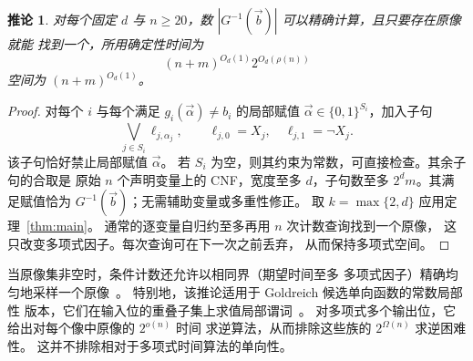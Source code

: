 \documentclass[11pt,reqno]{amsart}
\numberwithin{equation}{section}
\newtheorem{corollary}[theorem]{推论}
\theoremstyle{definition}\newtheorem{definition}[theorem]{定义}
\theoremstyle{remark}\newtheorem{remark}[theorem]{注}
\renewcommand{\ge}{\geqslant}
\begin{document}
\begin{corollary}\label{cor:consequence-local-inversion}
对每个固定 $d$ 与 $n\ge20$，数
$|G^{-1}(\vec{b})|$ 可以精确计算，且只要存在原像就能
找到一个，所用确定性时间为
\[
 (n+m)^{O_d(1)}2^{O_d(\rho(n))}
\]
空间为 $(n+m)^{O_d(1)}$。
\end{corollary}
\begin{proof}
对每个 $i$ 与每个满足 $g_i(\vec{\alpha})\ne b_i$ 的局部赋值
$\vec{\alpha}\in\{0,1\}^{S_i}$，加入子句
\[
 \bigvee_{j\in S_i}\ell_{j,\alpha_j},
 \qquad
 \ell_{j,0}=X_j,\quad \ell_{j,1}=\neg X_j.
\]
该子句恰好禁止局部赋值 $\vec{\alpha}$。
若 $S_i$ 为空，则其约束为常数，可直接检查。其余子句的合取是
原始 $n$ 个声明变量上的 CNF，宽度至多 $d$，子句数至多
$2^d m$。其满足赋值恰为
$G^{-1}(\vec{b})$；无需辅助变量或多重性修正。
取 $k=\max\{2,d\}$ 应用定理~\ref{thm:main}。
通常的逐变量自归约至多再用 $n$ 次计数查询找到一个原像，
这只改变多项式因子。每次查询可在下一次之前丢弃，
从而保持多项式空间。
\end{proof}

当原像集非空时，条件计数还允许以相同界（期望时间至多
多项式因子）精确均匀地采样一个原像~\cite{JVV86}。
特别地，该推论适用于 Goldreich 候选单向函数的常数局部性
版本，它们在输入位的重叠子集上求值局部谓词~\cite{Gol00}。
对多项式多个输出位，它给出对每个像中原像的 $2^{o(n)}$ 时间
求逆算法，从而排除这些族的 $2^{\Omega(n)}$ 求逆困难性。
这并不排除相对于多项式时间算法的单向性。



\end{document}
